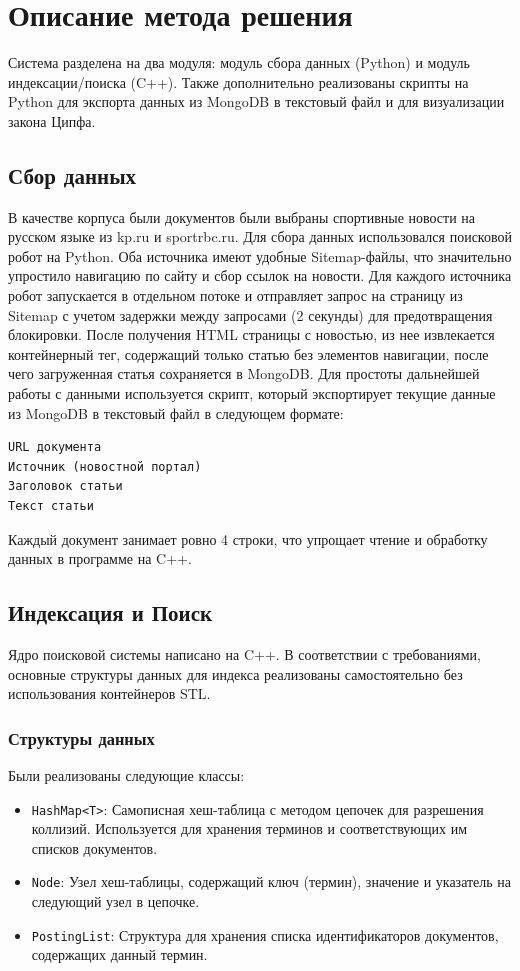 \section{Описание метода решения}

Система разделена на два модуля: модуль сбора данных (Python) и модуль индексации/поиска (C++). Также дополнительно реализованы скрипты на Python для экспорта данных из MongoDB в текстовый файл и для визуализации закона Ципфа.

\subsection{Сбор данных}
В качестве корпуса были документов были выбраны спортивные новости на русском языке из kp.ru и sportrbc.ru.
Для сбора данных использовался поисковой робот на Python. 
Оба источника имеют удобные Sitemap-файлы, что значительно упростило навигацию по сайту и сбор ссылок на новости. 
Для каждого источника робот запускается в отдельном потоке и отправляет запрос на страницу из Sitemap 
с учетом задержки между запросами (2 секунды) для предотвращения блокировки. 
После получения HTML страницы с новостью, из нее извлекается контейнерный тег, содержащий только статью без элементов навигации, 
после чего загруженная статья сохраняется в MongoDB. 
Для простоты дальнейшей работы с данными используется скрипт, который экспортирует текущие данные из MongoDB в текстовый файл в следующем формате:
\begin{verbatim}
URL документа
Источник (новостной портал)
Заголовок статьи
Текст статьи
\end{verbatim}

Каждый документ занимает ровно 4 строки, что упрощает чтение и обработку данных в программе на C++.

\subsection{Индексация и Поиск}
Ядро поисковой системы написано на C++. В соответствии с требованиями, основные структуры данных для индекса реализованы самостоятельно без использования контейнеров STL.

\subsubsection{Структуры данных}
Были реализованы следующие классы:
\begin{itemize}
    \item \texttt{HashMap<T>}: Самописная хеш-таблица с методом цепочек для разрешения коллизий. Используется для хранения терминов и соответствующих им списков документов.
    \item \texttt{Node}: Узел хеш-таблицы, содержащий ключ (термин), значение и указатель на следующий узел в цепочке.
    \item \texttt{PostingList}: Структура для хранения списка идентификаторов документов, содержащих данный термин.
\end{itemize}

